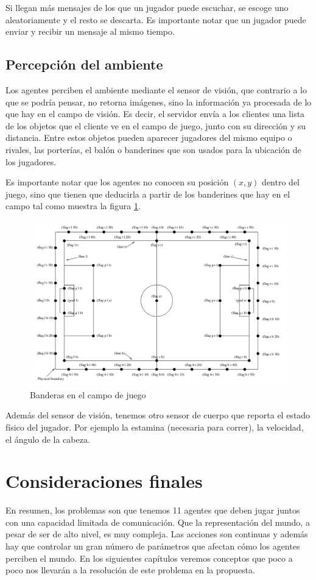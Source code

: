 Si llegan más mensajes de los que un jugador puede escuchar, se escoge uno aleatoriamente y el resto se descarta. Es importante notar que un jugador puede enviar y recibir un mensaje al mismo tiempo.

\subsection{Percepción del ambiente}

Los agentes perciben el ambiente mediante el sensor de visión, que contrario a lo que se podría pensar, no retorna imágenes, sino la información ya procesada de lo que hay en el campo de visión. Es decir, el servidor envía a los clientes una lista de los objetos que el cliente ve en el campo de juego, junto con su dirección y su distancia. Entre estos objetos pueden aparecer jugadores del mismo equipo o rivales, las porterías, el balón o banderines que son usados para la ubicación de los jugadores.

Es importante notar que los agentes no conocen su posición $(x, y)$ dentro del juego, sino que tienen que deducirla a partir de los banderines que hay en el campo tal como muestra la figura \ref{fig:flags}.


\begin{figure}[htb]
\centering
\includegraphics[width=150mm]{./graficos/flags.png}
\caption{Banderas en el campo de juego} \label{fig:flags}
\end{figure}

Además del sensor de visión, tenemos otro sensor de cuerpo que reporta el estado físico del jugador. Por ejemplo la estamina (necesaria para correr), la velocidad, el ángulo de la cabeza.


\section{Consideraciones finales}

En resumen, los problemas son que tenemos 11 agentes que deben jugar juntos con una capacidad limitada de comunicación. Que la representación del mundo, a pesar de ser de alto nivel, es muy compleja. Las acciones son continuas y además hay que controlar un gran número de parámetros que afectan cómo los agentes perciben el mundo. En los siguientes capítulos veremos conceptos que poco a poco nos llevarán a la resolución de este problema en la propuesta.